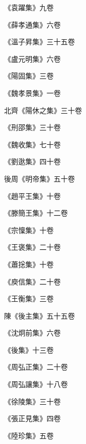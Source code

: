 \begin{pinyinscope}
 《袁躍集》九卷



 《薛孝通集》六卷



 《溫子昇集》三十五卷



 《盧元明集》六卷



 《陽固集》三卷



 《魏孝景集》一卷



 北齊《陽休之集》三十卷



 《刑邵集》三十卷



 《魏收集》七十卷



 《劉逖集》四十卷



 後周《明帝集》五十卷



 《趙平王集》十卷



 《滕簡王集》十二卷



 《宗懍集》十卷



 《王褒集》二十卷



 《蕭捴集》十卷



 《庾信集》二十卷



 《王衡集》三卷



 陳《後主集》五十五卷



 《沈炯前集》六卷



 《後集》十三卷



 《周弘正集》二十卷



 《周弘讓集》十八卷



 《徐陵集》三十卷



 《張正見集》四卷



 《陸珍集》五卷




\end{pinyinscope}
